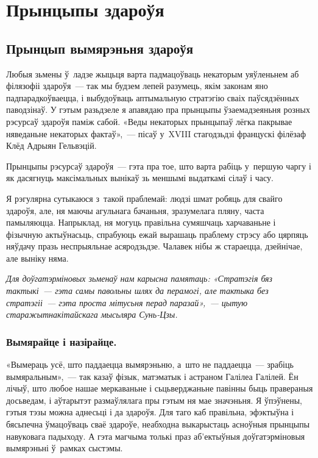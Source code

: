 \chapter{Прынцыпы здароўя}

\section{Прынцып вымярэньня здароўя}

Любыя зьмены ў~ладзе жыцьця варта падмацоўваць некаторым уяўленьнем аб філязофіі здароўя~--- так мы будзем лепей разумець, якім законам яно падпарадкоўваецца, і выбудоўваць аптымальную стратэгію сваіх паўсядзённых паводзінаў. У гэтым разьдзеле я апавядаю пра прынцыпы ўзаемадзеяньня розных рэсурсаў здароўя паміж сабой. «Веды некаторых прынцыпаў лёгка пакрывае няведаньне некаторых фактаў»,~--- пісаў у~XVIII стагодзьдзі францускі філёзаф Клёд Адрыян Гельвэцій.

Прынцыпы рэсурсаў здароўя~--- гэта пра тое, што варта рабіць у~першую чаргу і як дасягнуць максімальных вынікаў зь меншымі выдаткамі сілаў і часу.

Я рэгулярна сутыкаюся з~такой праблемай: людзі шмат робяць для свайго здароўя, але, ня маючы агульнага бачаньня, зразумелага пляну, часта памыляюцца. Напрыклад, ня могуць правільна сумяшчаць харчаваньне і фізычную актыўнасьць, спрабуюць ежай вырашаць праблему стрэсу або цярпяць няўдачу празь неспрыяльнае асяродзьдзе. Чалавек нібы ж стараецца, дзейнічае, але выніку няма. 

\emph{Для доўгатэрміновых зьменаў нам карысна памятаць: «Стратэгія бяз тактыкі~--- гэта самы павольны шлях да перамогі, але тактыка без стратэгіі~--- гэта проста мітусьня перад паразай»,~--- цытую старажытнакітайскага мысьляра Сунь-Цзы.}

\subsection*{Вымярайце і назірайце.}

«Вымераць усё, што паддаецца вымярэньню, а~што не паддаецца~--- зрабіць вымяральным»,~--- так казаў фізык, матэматык і астраном Галілеа Галілей. Ён лічыў, што любое нашае меркаваньне і сьцьверджаньне павінны быць правераныя досьведам, і аўтарытэт размаўлялага пры гэтым ня мае значэньня. Я ўпэўнены, гэтыя тэзы можна аднесьці і да здароўя. Для таго каб правільна, эфэктыўна і бясьпечна ўмацоўваць сваё здароўе, неабходна выкарыстаць асноўныя прынцыпы навуковага падыходу. А гэта магчыма толькі праз аб'ектыўныя доўгатэрміновыя вымярэньні ў~рамках сыстэмы.

